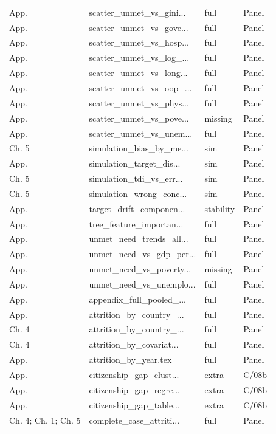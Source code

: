 \begin{longtable}{@{}p{}p{}p{}p{}@{}}
App. & scatter\_unmet\_vs\_gini... & full & Panel \\
App. & scatter\_unmet\_vs\_gove... & full & Panel \\
App. & scatter\_unmet\_vs\_hosp... & full & Panel \\
App. & scatter\_unmet\_vs\_log\_... & full & Panel \\
App. & scatter\_unmet\_vs\_long... & full & Panel \\
App. & scatter\_unmet\_vs\_oop\_... & full & Panel \\
App. & scatter\_unmet\_vs\_phys... & full & Panel \\
App. & scatter\_unmet\_vs\_pove... & missing & Panel \\
App. & scatter\_unmet\_vs\_unem... & full & Panel \\
Ch. 5 & simulation\_bias\_by\_me... & sim & Panel \\
App. & simulation\_target\_dis... & sim & Panel \\
Ch. 5 & simulation\_tdi\_vs\_err... & sim & Panel \\
Ch. 5 & simulation\_wrong\_conc... & sim & Panel \\
App. & target\_drift\_componen... & stability & Panel \\
App. & tree\_feature\_importan... & full & Panel \\
App. & unmet\_need\_trends\_all... & full & Panel \\
App. & unmet\_need\_vs\_gdp\_per... & full & Panel \\
App. & unmet\_need\_vs\_poverty... & missing & Panel \\
App. & unmet\_need\_vs\_unemplo... & full & Panel \\
App. & appendix\_full\_pooled\_... & full & Panel \\
App. & attrition\_by\_country\_... & full & Panel \\
Ch. 4 & attrition\_by\_country\_... & full & Panel \\
Ch. 4 & attrition\_by\_covariat... & full & Panel \\
App. & attrition\_by\_year.tex & full & Panel \\
App. & citizenship\_gap\_clust... & extra & C/08b \\
App. & citizenship\_gap\_regre... & extra & C/08b \\
App. & citizenship\_gap\_table... & extra & C/08b \\
Ch. 4; Ch. 1; Ch. 5 & complete\_case\_attriti... & full & Panel \\

\end{longtable}

